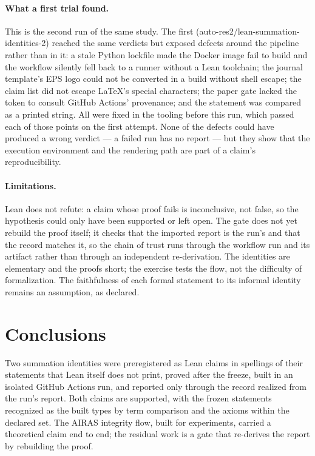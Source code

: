 \documentclass[journal,article,submit,pdftex,moreauthors]{Definitions/mdpi}
\begin{document}
\paragraph{What a first trial found.} This is the second run of the same study. The first (auto-res2/lean-summation-identities-2) reached the same verdicts but exposed defects around the pipeline rather than in it: a stale Python lockfile made the Docker image fail to build and the workflow silently fell back to a runner without a Lean toolchain; the journal template's EPS logo could not be converted in a build without shell escape; the claim list did not escape LaTeX's special characters; the paper gate lacked the token to consult GitHub Actions' provenance; and the statement was compared as a printed string. All were fixed in the tooling before this run, which passed each of those points on the first attempt. None of the defects could have produced a wrong verdict --- a failed run has no report --- but they show that the execution environment and the rendering path are part of a claim's reproducibility.

\paragraph{Limitations.} Lean does not refute: a claim whose proof fails is inconclusive, not false, so the hypothesis could only have been supported or left open. The gate does not yet rebuild the proof itself; it checks that the imported report is the run's and that the record matches it, so the chain of trust runs through the workflow run and its artifact rather than through an independent re-derivation. The identities are elementary and the proofs short; the exercise tests the flow, not the difficulty of formalization. The faithfulness of each formal statement to its informal identity remains an assumption, as declared.

\section{Conclusions}

Two summation identities were preregistered as Lean claims in spellings of their statements that Lean itself does not print, proved after the freeze, built in an isolated GitHub Actions run, and reported only through the record realized from the run's report. Both claims are supported, with the frozen statements recognized as the built types by term comparison and the axioms within the declared set. The AIRAS integrity flow, built for experiments, carried a theoretical claim end to end; the residual work is a gate that re-derives the report by rebuilding the proof.
\end{document}
